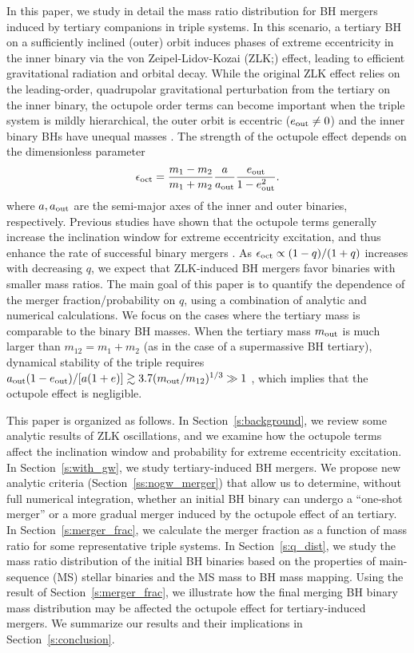 \documentclass[
        fleqn,
        usenatbib,
    ]{mnras}
\begin{document}
In this paper, we study in detail the mass ratio distribution for BH mergers
induced by tertiary companions in triple systems. In this scenario, a tertiary
BH on a sufficiently inclined (outer) orbit induces phases of extreme
eccentricity in the inner binary via the von Zeipel-Lidov-Kozai
(ZLK;\@\citealp{zeipel, lidov, kozai}) effect, leading to efficient gravitational
radiation and orbital decay.  While the original ZLK effect relies on the
leading-order, quadrupolar gravitational perturbation from the tertiary on the
inner binary, the octupole order terms can become important when the triple
system is mildly hierarchical, the outer orbit is eccentric ($e_{\rm out} \neq 0$)
and the inner binary BHs have unequal masses \citep[e.g.,][]{ford2000secular,
blaes2002kozai, lithwick2011eccentric, LML15}. The strength of the
octupole effect depends on the dimensionless parameter
\begin{align}
    \epsilon_{\rm oct} = \frac{m_1 - m_2}{m_1 + m_2} \frac{a}{a_{\rm out}}
        \frac{e_{\rm out}}{1 - e_{\rm out}^2}.\label{eq:eps_oct}
\end{align}
where $a, a_{\rm out}$ are the semi-major axes of the inner and outer binaries,
respectively. Previous studies have shown that the octupole terms generally
increase the inclination window for extreme eccentricity excitation, and thus
enhance the rate of successful binary mergers \citep{LL18}. As $\epsilon_{\rm
oct} \propto (1-q)/(1+q)$ increases with decreasing $q$, we expect that
ZLK-induced BH mergers favor binaries with smaller mass ratios. The main goal of
this paper is to quantify the dependence of the merger fraction/probability on
$q$, using a combination of analytic and numerical calculations. We focus on the
cases where the tertiary mass is comparable to the binary BH masses. When the
tertiary mass $m_{\rm out}$ is much larger than
$m_{12}=m_1+m_2$ (as in the case of a supermassive BH tertiary), dynamical
stability of the triple requires $a_{\rm out} (1-e_{\rm out}) /[a(1+e)]  \gtrsim
3.7 (m_{\rm out}/m_{12})^{1/3} \gg 1$ \citep{kiseleva}, which implies that
the octupole effect is negligible.

This paper is organized as follows. In Section~\ref{s:background}, we review
some analytic results of ZLK oscillations, and we examine how the octupole terms
affect the inclination window and probability for extreme eccentricity
excitation. In Section~\ref{s:with_gw}, we study tertiary-induced BH mergers.
We propose new analytic criteria (Section~\ref{ss:nogw_merger}) that allow us to
determine, without full numerical integration, whether an initial BH binary can
undergo a ``one-shot merger'' or a more gradual merger induced by the octupole
effect of an tertiary. In Section~\ref{s:merger_frac}, we calculate the merger
fraction as a function of mass ratio for some representative triple systems. In
Section~\ref{s:q_dist}, we study the mass ratio distribution of the initial BH
binaries based on the properties of main-sequence (MS) stellar binaries and the
MS mass to BH mass mapping. Using the result of Section~\ref{s:merger_frac}, we
illustrate how the final merging BH binary mass distribution may be affected the
octupole effect for tertiary-induced mergers. We summarize our results and their
implications in Section~\ref{s:conclusion}.
\end{document}
